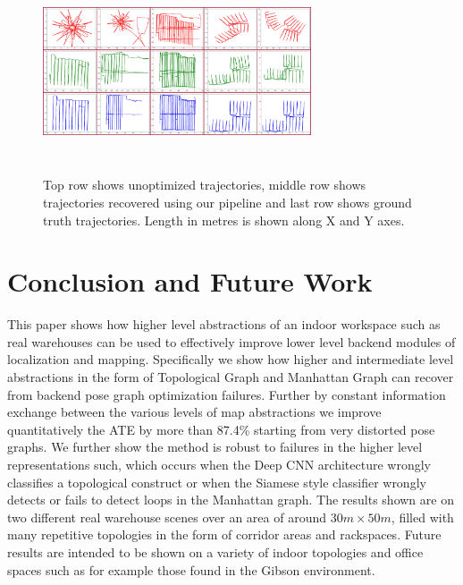 \documentclass[letterpaper, 10 pt, conference]{ieeeconf}  %
\begin{document}
	\begin{figure}[h!]
		\centering
		\includegraphics[width=300px,height=6cm]{pic/traj_recover.jpg}
		\caption{Top row shows unoptimized trajectories, middle row shows trajectories recovered using our pipeline and last row shows ground truth trajectories. Length in metres is shown along X and Y axes.}
		\label{fig:trajectory_recovery}
	\end{figure}
	
	
	
	\section{Conclusion and Future Work}
	
	This paper shows how higher level abstractions of an indoor workspace such as real warehouses can be used to effectively improve lower level backend modules of localization and mapping. Specifically we show how higher and intermediate level abstractions in the form of Topological Graph and Manhattan Graph can recover from backend pose graph optimization failures. Further by constant information exchange between the various levels of map abstractions we improve quantitatively the ATE by more than 87.4\% starting from very distorted pose graphs. We further show the method is robust to failures in the higher level representations such, which occurs when the Deep CNN architecture wrongly classifies a topological construct or when the Siamese style classifier wrongly detects or fails to detect loops in the Manhattan graph. The results shown are on two different real warehouse scenes over an area of around $30m \times 50m$, filled with many repetitive topologies in the form of corridor areas and rackspaces. Future results are intended to be shown on a variety of indoor topologies and office spaces such as for example those found in the Gibson environment.
	
	\newpage
	
	
	
\end{document}
